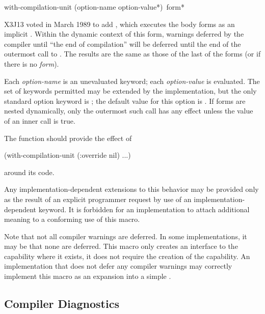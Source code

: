 \begin{newer}
\begin{defmac}
with-compilation-unit ({option-name option-value}*) {\,form}*

X3J13 voted in March 1989 
to add , which
   executes the body forms as an implicit . Within the dynamic context
   of this form, warnings deferred by the compiler until ``the end of
   compilation'' will be deferred until the end of the outermost call
   to . The results are the same as those of
   the last of the forms (or  if there is no \emph{form}).

   Each \emph{option-name} is an unevaluated keyword; each \emph{option-value}
   is evaluated. The set of keywords permitted may be extended by the
   implementation, but the only standard option keyword is ;
   the default value for this option is .
   If  forms are nested dynamically, only the outermost
   such call has any effect unless the  value of an
   inner call is true.

  The function  should
  provide the effect of
  \begin{lisp}
  (with-compilation-unit (:override nil) ...)
  \end{lisp}
  around its code.

  Any implementation-dependent extensions to this behavior may be provided only
  as the result of an explicit programmer request by use of 
  an implementation-dependent keyword.  It is forbidden for an implementation
  to attach additional meaning to a conforming use of this
  macro.

  Note that not all compiler warnings are deferred. In some implementations,
  it may be that none are deferred. This macro only creates an
  interface to the capability where it exists, it does not require the
  creation of the capability. An implementation that does not 
  defer any compiler warnings may correctly implement this macro
  as an expansion into a simple .
\end{defmac}
\end{newer}

\subsection{Compiler Diagnostics}
\label{COMPILER-DIAGNOSTICS-SECTION}


